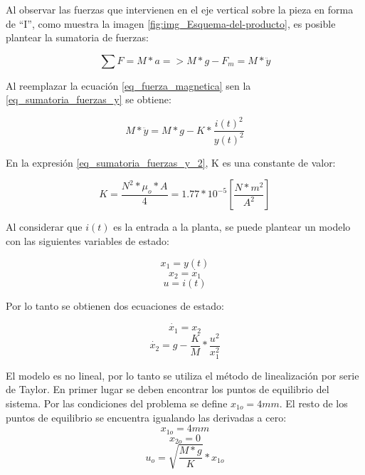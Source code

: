 \noindent Al observar las fuerzas que intervienen en el eje vertical sobre la pieza en forma de ``I'', como muestra la imagen \ref{fig:img_Esquema-del-producto}, es posible plantear la sumatoria de fuerzas:

\begin{equation}\label{eq_sumatoria_fuerzas_y}
	\sum F=M*a=>M*g-F_{m}=M*\ddot{y}
\end{equation}

\noindent Al reemplazar la ecuación \ref{eq_fuerza_magnetica} sen la \ref{eq_sumatoria_fuerzas_y} se obtiene:

\begin{equation}\label{eq_sumatoria_fuerzas_y_2}
	M*\ddot{y}=M*g-K*\frac{i(t)^{2}}{y(t)^{2}}
\end{equation}

\noindent En la expresión \ref{eq_sumatoria_fuerzas_y_2}, K es una constante de valor:

\begin{equation}
	K=\frac{N^{2}*\mu_{o}*A}{4}=1.77*10^{-5} [\frac{N*m^2}{A^2}]
\end{equation}

\noindent Al considerar que $i(t)$ es la entrada a la planta, se puede plantear un modelo con las siguientes variables de estado:\newline

\begin{equation}
	x_{1}=y(t)
\end{equation}
\begin{equation}
	x_{2}=\dot{x_{1}}
\end{equation}
\begin{equation}
	u=i(t)
\end{equation}

\noindent Por lo tanto se obtienen dos ecuaciones de estado:

\begin{equation}
	\dot{x_{1}}=x_{2}
\end{equation}
\begin{equation}
	\dot{x_{2}}=g-\frac{K}{M}*\frac{u^{2}}{x_{1}^{2}}
\end{equation}

\noindent El modelo es no lineal, por lo tanto se utiliza el método de linealización por serie de Taylor. En primer lugar se deben encontrar los puntos de equilibrio del sistema. Por las condiciones del problema se define $x_{1o}=4mm$. El resto de los puntos de equilibrio se encuentra igualando las derivadas a cero:
\begin{equation}
	x_{1o}=4mm
\end{equation}
\begin{equation}
	x_{2o}=0
\end{equation}
\begin{equation}
	u_{o}=\sqrt{\frac{M*g}{K}}*x_{1o}
\end{equation}

